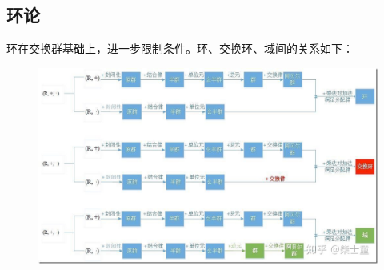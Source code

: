 \documentclass[12pt]{article}
\begin{document}
\subsection{环论}
环在交换群基础上，进一步限制条件。环、交换环、域间的关系如下：
\begin{figure}[H]
    \centering
    \includegraphics[width=1.0\textwidth]{fig/GroupRingField.jpg}
\end{figure}
\end{document}
